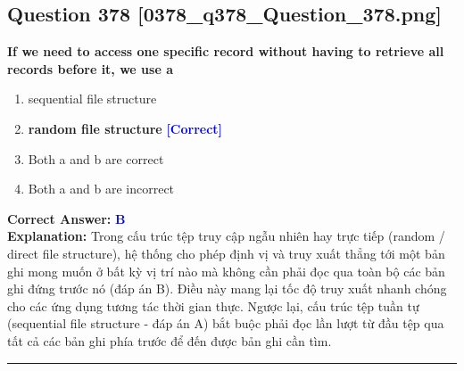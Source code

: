 \documentclass[11pt,a4paper]{article}
\begin{document}
\begin{minipage}{\textwidth}
\subsection*{Question 378 \quad \footnotesize{[0378\_q378\_Question\_378.png]}}
\noindent \textbf{If we need to access one specific record without having to retrieve all records before it, we use a}

\begin{enumerate}[label=\Alph*.]
    \item sequential file structure
    \item \textbf{random file structure} \hfill \textcolor{blue}{\textbf{[Correct]}}
    \item Both a and b are correct
    \item Both a and b are incorrect
\end{enumerate}

\noindent \textbf{Correct Answer:} \textcolor{blue}{\textbf{B}} \\[2pt]
\noindent \textbf{Explanation:} Trong cấu trúc tệp truy cập ngẫu nhiên hay trực tiếp (random / direct file structure), hệ thống cho phép định vị và truy xuất thẳng tới một bản ghi mong muốn ở bất kỳ vị trí nào mà không cần phải đọc qua toàn bộ các bản ghi đứng trước nó (đáp án B). Điều này mang lại tốc độ truy xuất nhanh chóng cho các ứng dụng tương tác thời gian thực. Ngược lại, cấu trúc tệp tuần tự (sequential file structure - đáp án A) bắt buộc phải đọc lần lượt từ đầu tệp qua tất cả các bản ghi phía trước để đến được bản ghi cần tìm.

\par\vspace{0.3cm}
\hrule
\vspace{0.3cm}
\end{minipage}
\end{document}
